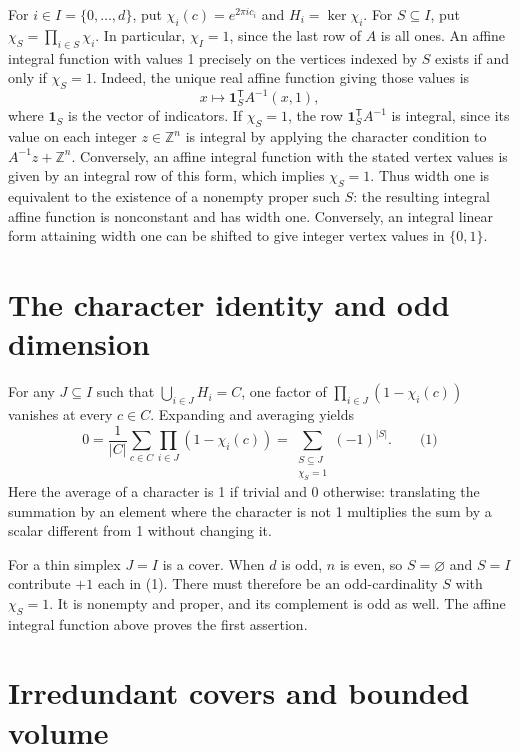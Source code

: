 \documentclass[11pt]{article}
\begin{document}
For \(i\in I=\{0,\dots,d\}\), put \(\chi_i(c)=e^{2\pi i c_i}\) and \(H_i=\ker\chi_i\). For \(S\subseteq I\), put \(\chi_S=\prod_{i\in S}\chi_i\). In particular, \(\chi_I=1\), since the last row of \(A\) is all ones. An affine integral function with values 1 precisely on the vertices indexed by \(S\) exists if and only if \(\chi_S=1\). Indeed, the unique real affine function giving those values is
\[
x\longmapsto \mathbf{1}_S^\mathsf T A^{-1}(x,1),
\]
where \(\mathbf{1}_S\) is the vector of indicators. If \(\chi_S=1\), the row \(\mathbf{1}_S^\mathsf T A^{-1}\) is integral, since its value on each integer \(z\in\mathbb Z^n\) is integral by applying the character condition to \(A^{-1}z+\mathbb Z^n\). Conversely, an affine integral function with the stated vertex values is given by an integral row of this form, which implies \(\chi_S=1\). Thus width one is equivalent to the existence of a nonempty proper such \(S\): the resulting integral affine function is nonconstant and has width one. Conversely, an integral linear form attaining width one can be shifted to give integer vertex values in \(\{0,1\}\).

\section{The character identity and odd dimension}\label{the-character-identity-and-odd-dimension}

For any \(J\subseteq I\) such that \(\bigcup_{i\in J}H_i=C\), one factor of \(\prod_{i\in J}(1-\chi_i(c))\) vanishes at every \(c\in C\). Expanding and averaging yields
\[
0=\frac{1}{|C|}\sum_{c\in C}\prod_{i\in J}(1-\chi_i(c))
 =\sum_{\substack{S\subseteq J\\ \chi_S=1}}(-1)^{|S|}. \qquad\text{(1)}
\]
Here the average of a character is 1 if trivial and 0 otherwise: translating the summation by an element where the character is not 1 multiplies the sum by a scalar different from 1 without changing it.

For a thin simplex \(J=I\) is a cover. When \(d\) is odd, \(n\) is even, so \(S=\varnothing\) and \(S=I\) contribute \(+1\) each in (1). There must therefore be an odd-cardinality \(S\) with \(\chi_S=1\). It is nonempty and proper, and its complement is odd as well. The affine integral function above proves the first assertion.

\section{Irredundant covers and bounded volume}\label{irredundant-covers-and-bounded-volume}
\end{document}
